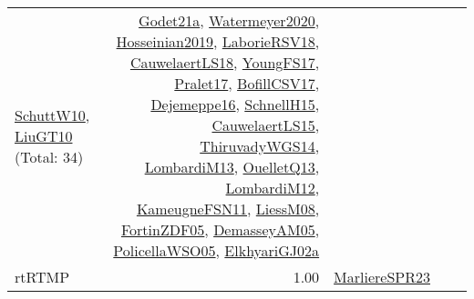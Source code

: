 {\begin{longtable}{p{3cm}r>{\raggedright\arraybackslash}p{6cm}>{\raggedright\arraybackslash}p{6cm}>{\raggedright\arraybackslash}p{8cm}}
\hyperref[detail:SchuttW10]{SchuttW10}, \hyperref[detail:LiuGT10]{LiuGT10} (Total: 34) & \hyperref[detail:Godet21a]{Godet21a}, \hyperref[detail:Watermeyer2020]{Watermeyer2020}, \hyperref[detail:Hosseinian2019]{Hosseinian2019}, \hyperref[detail:LaborieRSV18]{LaborieRSV18}, \hyperref[detail:CauwelaertLS18]{CauwelaertLS18}, \hyperref[detail:YoungFS17]{YoungFS17}, \hyperref[detail:Pralet17]{Pralet17}, \hyperref[detail:BofillCSV17]{BofillCSV17}, \hyperref[detail:Dejemeppe16]{Dejemeppe16}, \hyperref[detail:SchnellH15]{SchnellH15}, \hyperref[detail:CauwelaertLS15]{CauwelaertLS15}, \hyperref[detail:ThiruvadyWGS14]{ThiruvadyWGS14}, \hyperref[detail:LombardiM13]{LombardiM13}, \hyperref[detail:OuelletQ13]{OuelletQ13}, \hyperref[detail:LombardiM12]{LombardiM12}, \hyperref[detail:KameugneFSN11]{KameugneFSN11}, \hyperref[detail:LiessM08]{LiessM08}, \hyperref[detail:FortinZDF05]{FortinZDF05}, \hyperref[detail:DemasseyAM05]{DemasseyAM05}, \hyperref[detail:PolicellaWSO05]{PolicellaWSO05}, \hyperref[detail:ElkhyariGJ02a]{ElkhyariGJ02a}\\
\index{rtRTMP}\index{Classification!rtRTMP}rtRTMP &  1.00 & \hyperref[detail:MarliereSPR23]{MarliereSPR23} &  & \\

\end{longtable}}
